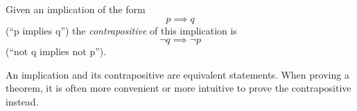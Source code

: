 \documentclass{article}
\begin{document}
Given an implication of the form
$$p \implies q$$
(``p implies q'') the \emph{contrapositive} of this implication is
$$\neg q \implies \neg p$$
(``not q implies not p'').

An implication and its contrapositive are equivalent statements.  When proving a theorem, it is often more convenient or more intuitive to prove the contrapositive instead.
\end{document}
